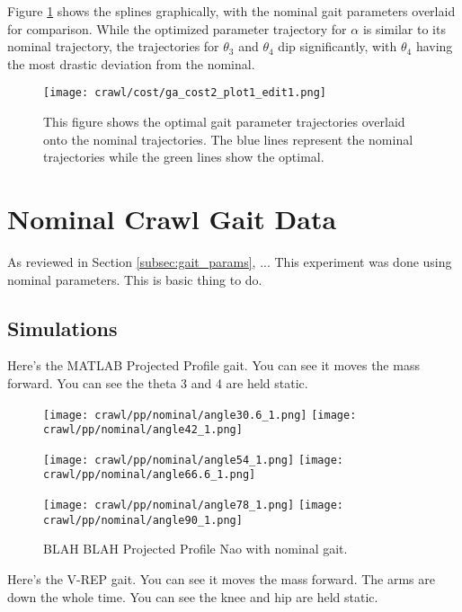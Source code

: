 Figure \ref{fig:optimal_gait_parameters} shows the splines graphically, with the nominal gait parameters
overlaid for comparison. While the optimized parameter trajectory for $\alpha$ is similar to its nominal
trajectory, the trajectories for $\theta_3$ and $\theta_4$ dip significantly, with $\theta_4$ having the
most drastic deviation from the nominal.

\begin{figure}
  \centerline{
    \texttt{[image: crawl/cost/ga\_cost2\_plot1\_edit1.png]}
  }
  \caption{This figure shows the optimal gait parameter trajectories overlaid onto the nominal
           trajectories. The blue lines represent the nominal trajectories while the green
           lines show the optimal.}
  \label{fig:optimal_gait_parameters}
\end{figure}




\FloatBarrier
\section{Nominal Crawl Gait Data} \label{sec:nom_crawl_data}

As reviewed in Section \ref{subsec:gait_params}, ...
This experiment was done using nominal parameters.
This is basic thing to do.

\subsection{Simulations}
Here's the MATLAB Projected Profile gait. You can see it moves the mass forward.
You can see the theta 3 and 4 are held static.

\begin{figure}
  \centerline{
    \texttt{[image: crawl/pp/nominal/angle30.6\_1.png]}
    \texttt{[image: crawl/pp/nominal/angle42\_1.png]}
  }
  \centerline{
    \texttt{[image: crawl/pp/nominal/angle54\_1.png]}
    \texttt{[image: crawl/pp/nominal/angle66.6\_1.png]}
  }
  \centerline{
    \texttt{[image: crawl/pp/nominal/angle78\_1.png]}
    \texttt{[image: crawl/pp/nominal/angle90\_1.png]}
  }
  \caption{BLAH BLAH Projected Profile Nao with nominal gait.}
  \label{fig:pp_nom_gait1}
\end{figure}

Here's the V-REP gait. You can see it moves the mass forward.
The arms are down the whole time.
You can see the knee and hip are held static.

